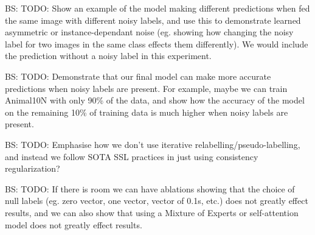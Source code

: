 \documentclass[10pt,twocolumn,letterpaper]{article}
\newcommand{\brandon}[1]{{\color{orange}BS: #1}}
\begin{document}
\clearpage

\brandon{TODO: Show an example of the model making different predictions when fed the same image with different noisy labels, and use this to demonstrate learned asymmetric or instance-dependant noise (eg. showing how changing the noisy label for two images in the same class effects them differently). We would include the prediction without a noisy label in this experiment.}

\brandon{TODO: Demonstrate that our final model can make more accurate predictions when noisy labels are present. For example, maybe we can train Animal10N with only 90\% of the data, and show how the accuracy of the model on the remaining 10\% of training data is much higher when noisy labels are present}.


\brandon{TODO: Emphasise how we don't use iterative relabelling/pseudo-labelling, and instead we follow SOTA SSL practices in just using consistency regularization?}

\brandon{TODO: If there is room we can have ablations showing that the choice of null labels (eg. zero vector, one vector, vector of 0.1s, etc.) does not greatly effect results, and we can also show that using a Mixture of Experts or self-attention model does not greatly effect results}.

{\small


}
\end{document}
